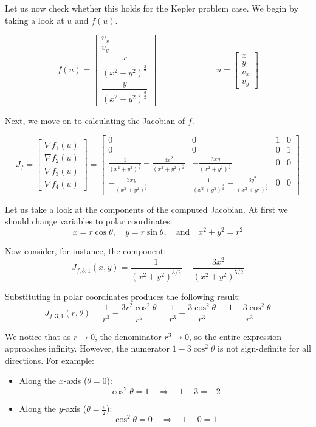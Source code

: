 \documentclass[11pt]{article}
\begin{document}
Let us now check whether this holds for the Kepler problem case. We begin by taking a look at $u$ and $f(u)$.

\[
f(u) =
\begin{bmatrix}
v_x \\[5pt]
v_y \\[5pt]
\dfrac{x}{(x^2 + y^2)^{\frac{3}{2}}} \\[5pt]
\dfrac{y}{(x^2 + y^2)^{\frac{3}{2}}}
\end{bmatrix}
\quad \quad \quad \quad \quad \quad \quad
u =
\begin{bmatrix}
x \\[5pt]
y \\[5pt]
v_x \\[5pt]
v_y
\end{bmatrix}
\]

Next, we move on to calculating the Jacobian of $f$.

\[
J_f =
\begin{bmatrix}
\nabla f_1(u) \\[6pt]
\nabla f_2(u) \\[6pt]
\nabla f_3(u) \\[6pt]
\nabla f_4(u)
\end{bmatrix}
=
\left[
\begin{array}{cccc}
0 & 0 & 1 & 0 \\
0 & 0 & 0 & 1 \\
\frac{1}{(x^2 + y^2)^{\frac{3}{2}}} - \frac{3x^2}{(x^2 + y^2)^{\frac{5}{2}}} & -\frac{3xy}{(x^2 + y^2)^{\frac{5}{2}}} & 0 & 0 \\
-\frac{3xy}{(x^2 + y^2)^{\frac{5}{2}}} & \frac{1}{(x^2 + y^2)^{\frac{3}{2}}} - \frac{3y^2}{(x^2 + y^2)^{\frac{5}{2}}} & 0 & 0
\end{array}
\right]
\]

Let us take a look at the components of the computed Jacobian. At first we should change variables to polar coordinates:
\[
x = r \cos\theta, \quad y = r \sin\theta, \quad \text{and} \quad x^2 + y^2 = r^2
\]

Now consider, for instance, the component:
\[
J_{f,3,1}(x, y) = \frac{1}{(x^2 + y^2)^{3/2}} - \frac{3x^2}{(x^2 + y^2)^{5/2}}
\]

Substituting in polar coordinates produces the following result:
\[
J_{f,3,1}(r, \theta) = \frac{1}{r^3} - \frac{3r^2 \cos^2\theta}{r^5}
= \frac{1}{r^3} - \frac{3 \cos^2\theta}{r^3}
= \frac{1 - 3\cos^2\theta}{r^3}
\]

We notice that as \( r \to 0 \), the denominator \( r^3 \to 0 \), so the entire expression approaches infinity. However, the numerator \( 1 - 3\cos^2\theta \) is not sign-definite for all directions. For example:
\begin{itemize}
  \item Along the \(x\)-axis (\( \theta = 0 \)): 
  \[
  \cos^2\theta = 1 \quad \Rightarrow \quad 1 - 3 = -2
  \]
  \item Along the \(y\)-axis (\( \theta = \frac{\pi}{2} \)): 
  \[
  \cos^2\theta = 0 \quad \Rightarrow \quad 1 - 0 = 1
  \]
\end{itemize}
\end{document}
